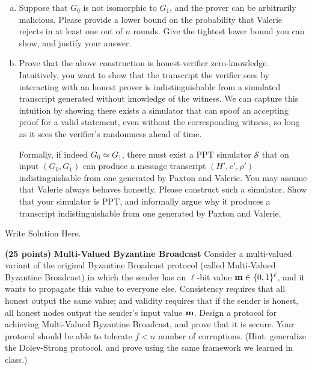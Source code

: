 \documentclass[12pt]{hw}
\begin{document}
\begin{exercise}
\begin{enumerate}[(a)]
\item 
Suppose that $G_0$ is not isomorphic to $G_1$, and the prover 
can be arbitrarily malicious.
Please provide a lower bound on the probability that Valerie rejects in at least
one out of $n$ rounds. Give the tightest 
lower bound you can show, and justify your answer.

\item 
Prove that the above construction is honest-verifier zero-knowledge. 
Intuitively, 
you want to show that the transcript the verifier sees by interacting with an honest prover is indistinguishable from a simulated transcript generated without knowledge of the witness.
We can capture this intuition by showing there exists a simulator that can spoof an accepting proof for a valid statement, even without the corresponding witness, so long as it sees the verifier's randomness ahead of time.

Formally, if indeed $G_0 \simeq G_1$, there must exist a PPT simulator $\mathcal{S}$ that on input $(G_0, G_1)$ can produce a message transcript $(H', c', \rho')$ indistinguishable from one generated by Paxton and Valerie. You may assume that Valerie always behaves honestly.
Please construct such a simulator. 
Show that your simulator is PPT, and informally argue why it produces a transcript indistinguishable from one generated by Paxton and Valerie.


\end{enumerate}


\end{exercise}
\begin{answer}
Write Solution Here.
\end{answer}


\begin{exercise}
{\bf (25 points)}
{\bf Multi-Valued Byzantine Broadcast}
Consider a multi-valued variant of the original Byzantine Broadcast protocol (called Multi-Valued Byzantine Broadcast) in which the sender has an $\ell$-bit value ${\bf m} \in \{0, 1\}^\ell$, and it wants to propagate this value to everyone else. Consistency requires that all honest output the same value; and validity requires that if the sender is honest, all honest nodes output the sender's input value ${\bf m}$.
Design a protocol for achieving Multi-Valued Byzantine Broadcast, and prove that it is secure. Your protocol should be able to tolerate $f < n$ number of corruptions.
(Hint: generalize the Dolev-Strong protocol, and prove using the same framework we learned in class.)

\end{exercise}
\end{document}
